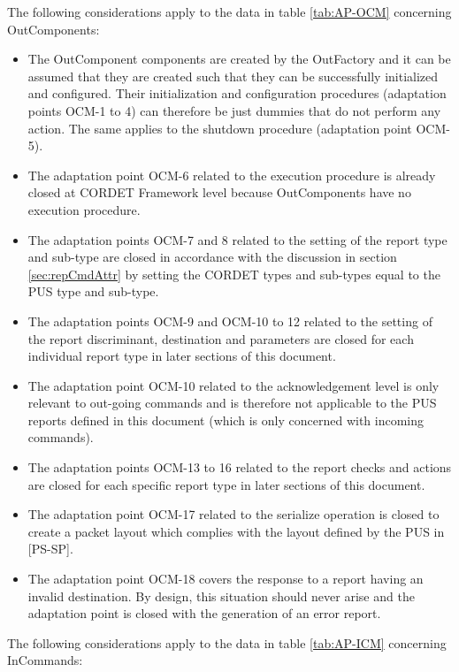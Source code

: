 \documentclass{pnp_article}
\begin{document}
The following considerations apply to the data in table \ref{tab:AP-OCM} concerning OutComponents:

\begin{itemize}
\item The OutComponent components are created by the OutFactory and it can be assumed that they are created such that they can be successfully initialized and configured. Their initialization and configuration procedures (adaptation points OCM-1 to 4) can therefore be just dummies that do not perform any action. The same applies to the shutdown procedure (adaptation point OCM-5).
\item The adaptation point OCM-6 related to the execution procedure is already closed at CORDET Framework level because OutComponents have no execution procedure.
\item The adaptation points OCM-7 and 8 related to the setting of the report type and sub-type are closed in accordance with the discussion in section \ref{sec:repCmdAttr} by setting the CORDET types and sub-types equal to the PUS type and sub-type.
\item The adaptation points OCM-9 and OCM-10 to 12 related to the setting of the report discriminant, destination and parameters are closed for each individual report type in later sections of this document.
\item The adaptation point OCM-10 related to the acknowledgement level is only relevant to out-going commands and is therefore not applicable to the PUS reports defined in this document (which is only concerned with incoming commands).
\item The adaptation points OCM-13 to 16 related to the report checks and actions are closed for each specific report type in later sections of this document.
\item The adaptation point OCM-17 related to the serialize operation is closed to create a packet layout which complies with the layout defined by the PUS in [PS-SP].
\item The adaptation point OCM-18 covers the response to a report having an invalid destination. By design, this situation should never arise and the adaptation point is closed with the generation of an error report.
\end{itemize}

The following considerations apply to the data in table \ref{tab:AP-ICM} concerning InCommands:
\end{document}

